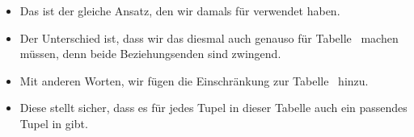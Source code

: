 \begin{frame}
{\begin{itemize}
{}%
%
\item<33-> Das ist der gleiche Ansatz, den wir damals für  verwendet haben.%
%
\item<34-> Der Unterschied ist, dass wir das diesmal auch genauso für Tabelle~ machen müssen, denn beide Beziehungsenden sind zwingend.%
%
\item<35-> Mit anderen Worten, wir fügen die Einschränkung  zur Tabelle~ hinzu.%
%
\item<36-> Diese stellt sicher, dass es für jedes Tupel  in dieser Tabelle auch ein passendes Tupel  in  gibt.%
%
\end{itemize}%
}%
%
\end{frame}%
%
